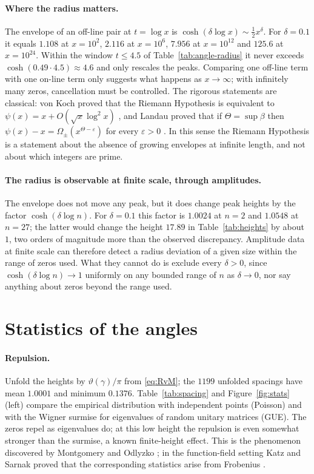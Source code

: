\documentclass[11pt,a4paper]{article}
\theoremstyle{definition}\newtheorem{definition}[proposition]{Definition}
\theoremstyle{remark}\newtheorem{remark}[proposition]{Remark}
\begin{document}
\paragraph{Where the radius matters.} The envelope of an off-line pair at $t=\log x$ is $\cosh(\delta\log x)\sim\tfrac12x^{\delta}$. For $\delta=0.1$ it equals $1.108$ at $x=10^2$, $2.116$ at $x=10^6$, $7.956$ at $x=10^{12}$ and $125.6$ at $x=10^{24}$. Within the window $t\le4.5$ of Table~\ref{tab:angle-radius} it never exceeds $\cosh(0.49\cdot4.5)\approx4.6$ and only rescales the peaks. Comparing one off-line term with one on-line term only suggests what happens as $x\to\infty$; with infinitely many zeros, cancellation must be controlled. The rigorous statements are classical: von Koch proved that the Riemann Hypothesis is equivalent to $\psi(x)=x+O(\sqrt x\log^2x)$ \cite{vonKoch1901}, and Landau proved that if $\Theta=\sup\beta$ then $\psi(x)-x=\Omega_\pm(x^{\Theta-\varepsilon})$ for every $\varepsilon>0$ \cite{Ingham1932}. In this sense the Riemann Hypothesis is a statement about the absence of growing envelopes at infinite length, and not about which integers are prime.

\paragraph{The radius is observable at finite scale, through amplitudes.} The envelope does not move any peak, but it does change peak heights by the factor $\cosh(\delta\log n)$. For $\delta=0.1$ this factor is $1.0024$ at $n=2$ and $1.0548$ at $n=27$; the latter would change the height $17.89$ in Table~\ref{tab:heights} by about $1$, two orders of magnitude more than the observed discrepancy. Amplitude data at finite scale can therefore detect a radius deviation of a given size within the range of zeros used. What they cannot do is exclude every $\delta>0$, since $\cosh(\delta\log n)\to1$ uniformly on any bounded range of $n$ as $\delta\to0$, nor say anything about zeros beyond the range used.

\section{Statistics of the angles}\label{sec:stats}
\paragraph{Repulsion.} Unfold the heights by $\vartheta(\gamma)/\pi$ from \eqref{eq:RvM}; the $1199$ unfolded spacings have mean $1.0001$ and minimum $0.1376$. Table~\ref{tab:spacing} and Figure~\ref{fig:stats} (left) compare the empirical distribution with independent points (Poisson) and with the Wigner surmise for eigenvalues of random unitary matrices (GUE). The zeros repel as eigenvalues do; at this low height the repulsion is even somewhat stronger than the surmise, a known finite-height effect. This is the phenomenon discovered by Montgomery and Odlyzko \cite{Montgomery1973,Odlyzko1987}; in the function-field setting Katz and Sarnak proved that the corresponding statistics arise from Frobenius \cite{KatzSarnak1999}.
\end{document}
